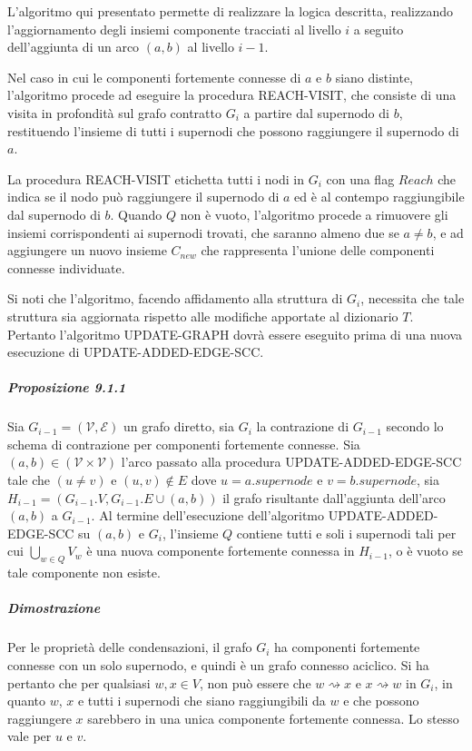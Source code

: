 L'algoritmo qui presentato permette di realizzare la logica descritta, realizzando l'aggiornamento degli insiemi
componente tracciati al livello $i$ a seguito dell'aggiunta di un arco $(a, b)$ al livello $i-1$.



Nel caso in cui le componenti fortemente connesse di $a$ e $b$ siano distinte, l'algoritmo procede ad eseguire la
procedura REACH-VISIT, che consiste di una visita in profondit\`a sul grafo contratto $G_i$ a partire dal supernodo
di $b$, restituendo l'insieme di tutti i supernodi che possono raggiungere il supernodo di $a$.




La procedura REACH-VISIT etichetta tutti i nodi in $G_i$ con una flag $Reach$ che indica se il nodo pu\`o raggiungere
il supernodo di $a$ ed \`e al contempo raggiungibile dal supernodo di $b$.
Quando $Q$ non \`e vuoto, l'algoritmo procede a rimuovere gli insiemi corrispondenti ai supernodi trovati, che saranno almeno
due se $a \neq b$, e ad aggiungere un nuovo insieme $C_{new}$ che rappresenta l'unione delle componenti connesse
individuate. \newline

Si noti che l'algoritmo, facendo affidamento alla struttura di $G_i$, necessita che tale struttura sia
aggiornata rispetto alle modifiche apportate al dizionario $T$.
Pertanto l'algoritmo UPDATE-GRAPH dovr\`a essere eseguito prima di una nuova esecuzione di UPDATE-ADDED-EDGE-SCC.

\subparagraph{Proposizione 9.1.1}
Sia $G_{i-1} = (\mathcal{V}, \mathcal{E})$ un grafo diretto, sia $G_i$ la contrazione di $G_{i-1}$ secondo
lo schema di contrazione per componenti fortemente connesse.
Sia $(a, b) \in (\mathcal{V} \times \mathcal{V})$ l'arco passato alla procedura UPDATE-ADDED-EDGE-SCC tale che
$(u \neq v)$ e $(u, v) \notin E$ dove $u = a.supernode$ e $v = b.supernode$, sia
$H_{i-1} = (G_{i-1}.V, G_{i-1}.E \cup {(a, b)})$ il grafo risultante dall'aggiunta dell'arco $(a, b)$ a $G_{i-1}$.
\newline
Al termine dell'esecuzione dell'algoritmo UPDATE-ADDED-EDGE-SCC su $(a, b)$ e $G_i$, l'insieme $Q$ contiene tutti e
soli i supernodi tali per cui $\bigcup_{w \in Q} V_w$ \`e una nuova componente fortemente connessa
in $H_{i-1}$, o \`e vuoto se tale componente non esiste.

\subparagraph{Dimostrazione}
Per le propriet\`a delle condensazioni, il grafo $G_i$ ha componenti fortemente connesse con un solo supernodo,
e quindi \`e un grafo connesso aciclico.
Si ha pertanto che per qualsiasi $w, x \in V$, non pu\`o essere che $w \rightsquigarrow x$ e $x \rightsquigarrow w$
in $G_i$, in quanto $w$, $x$ e tutti i supernodi che siano raggiungibili da $w$ e che possono raggiungere
$x$ sarebbero in una unica componente fortemente connessa.
Lo stesso vale per $u$ e $v$.

